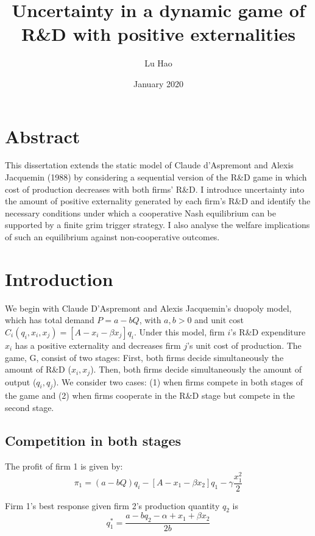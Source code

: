 \documentclass{article}
\title{Uncertainty in a dynamic game of R\&D with positive externalities}
\author{Lu Hao}
\date{January 2020}
\begin{document}
\maketitle
\section{Abstract} 

This dissertation extends the static model of Claude d'Aspremont and Alexis Jacquemin (1988) by considering a sequential version of the R\&D game in which cost of production decreases with both firms’ R\&D. I introduce uncertainty into the amount of positive externality generated by each firm’s R\&D and identify the necessary conditions under which a cooperative Nash equilibrium can be supported by a finite grim trigger strategy. I also analyse the welfare implications of such an equilibrium against non-cooperative outcomes.

\section{Introduction}

We begin with Claude D'Aspremont and Alexis Jacquemin's duopoly model, which has total demand $P = a-bQ$, with $a,b > 0$  and unit cost $C_i(q_i, x_i, x_j) = [A - x_i - \beta x_j]q_i$. Under this model, firm $i$'s R\&D expenditure $x_i$ has a positive externality and decreases firm $j$'s unit cost of production. The game, G, consist of two stages: First, both firms decide simultaneously the amount of R\&D ($x_i , x_j$). Then, both firms decide simultaneously  the amount of output ($q_i, q_j$). We consider two cases: (1) when firms compete in both stages of the game and (2) when firms cooperate in the R\&D stage but compete in the second stage.

\subsection{Competition in both stages}

The profit of firm 1 is given by: 
\begin{equation*}
    \pi_1 = (a-bQ)q_i - [A - x_1 -\beta x_2]q_1 - \gamma \frac{x_1^2}{2}    
\end{equation*}


Firm 1's best response given firm 2's production quantity $q_2$ is 
\begin{equation*}
q_1^*=\frac{a-bq_2-\alpha+x_1+\beta x_2}{2b}   
\end{equation*}
\end{document}
